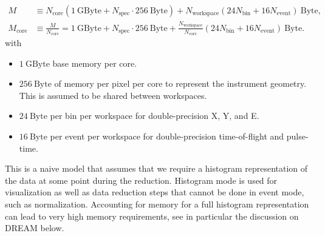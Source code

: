 \documentclass[a4paper,english,numbers=noenddot,bibliography=totoc,chapterprefix=on,DIV=12]{scrartcl}
\newcommand{\Nbin}{N_{\text{bin}}}
\newcommand{\Ncore}{N_{\text{core}}}
\newcommand{\Nevent}{N_{\text{event}}}
\newcommand{\Nworkspace}{N_{\text{workspace}}}
\newcommand{\Nspec}{N_{\text{spec}}}
\newcommand{\Mcore}{M_{\text{core}}}
\newcommand{\dream}{DREAM\xspace}
\begin{document}
\begin{align}
  \label{eq:ram}
  M &\equiv \Ncore(1~\mathrm{GByte} + \Nspec \cdot 256~\mathrm{Byte}) + N_{\text{workspace}}(24\Nbin + 16\Nevent)~\mathrm{Byte},\\
  \Mcore &\equiv \frac{M}{\Ncore} = 1~\mathrm{GByte} + \Nspec \cdot 256~\mathrm{Byte} + \frac{\Nworkspace}{\Ncore}(24\Nbin + 16\Nevent)~\mathrm{Byte}.
\end{align}
with
\begin{itemize}
  \item $1~\mathrm{GByte}$ base memory per core.
  \item $256~\mathrm{Byte}$ of memory per pixel per core to represent the instrument geometry.
    This is assumed to be shared between workspaces.
  \item $24~\mathrm{Byte}$ per bin per workspace for double-precision X, Y, and E.
  \item $16~\mathrm{Byte}$ per event per workspace for double-precision time-of-flight and pulse-time.
\end{itemize}
This is a naive model that assumes that we require a histogram representation of the data at some point during the reduction.
Histogram mode is used for visualization as well as data reduction steps that cannot be done in event mode, such as normalization.
Accounting for memory for a full histogram representation can lead to very high memory requirements, see in particular the discussion on \dream below.
\end{document}
